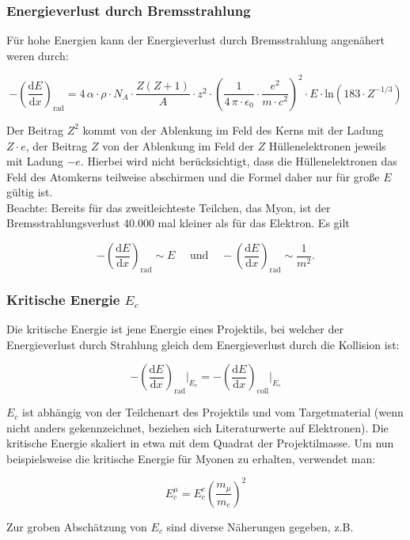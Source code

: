 \subsubsection*{Energieverlust durch Bremsstrahlung}

Für hohe Energien kann der Energieverlust durch Bremsstrahlung angenähert weren durch:

\[-\left(\frac{\mathrm{d}E}{\mathrm{d}x}\right)_{\text{rad}} = 4\,\alpha\cdot \rho\cdot N_A \cdot
\frac{Z(Z+1)}{A} \cdot z^2\cdot \left(\frac{1}{4\,\pi\cdot \epsilon_0}\cdot \frac{e^2}{m\cdot c^2}
\right)^2 \cdot E\cdot \text{ln}(183\cdot Z^{-1/3}) \]

Der Beitrag $Z^2$ kommt von der Ablenkung im Feld des Kerns mit der Ladung $Z\cdot e$, der Beitrag
$Z$ von der Ablenkung im Feld der $Z$ Hüllenelektronen jeweils mit Ladung $-e$. Hierbei wird nicht
berücksichtigt, dass die Hüllenelektronen das Feld des Atomkerns teilweise abschirmen und die Formel
daher nur für große $E$ gültig ist.
\\
Beachte: Bereits für das zweitleichteste Teilchen, das Myon, ist der Bremsstrahlungsverlust 40.000
mal kleiner als für das Elektron. Es gilt

\[-\left(\frac{\mathrm{d}E}{\mathrm{d}x}\right)_{\text{rad}} \sim E~~~~~~\text{und}~~~~~
-\left(\frac{\mathrm{d}E}{\mathrm{d}x}\right)_{\text{rad}} \sim \frac{1}{m^2}.\]

\subsubsection*{Kritische Energie $E_c$}

Die kritische Energie ist jene Energie eines Projektils, bei welcher der Energieverlust durch
Strahlung gleich dem Energieverlust durch die Kollision ist:

\[-\left(\frac{\mathrm{d}E}{\mathrm{d}x}\right)_{\text{rad}} \bigg|_{E_c} = -\left(\frac{\mathrm{d}E}{\mathrm{d}x}\right)_{\text{coll}}
\bigg|_{E_c}  \]

$E_c$ ist abhängig von der Teilchenart des Projektils und vom Targetmaterial (wenn nicht anders
gekennzeichnet, beziehen sich Literaturwerte auf Elektronen). Die kritische Energie skaliert in etwa
mit dem Quadrat der Projektilmasse. Um nun beispielsweise die kritische Energie für Myonen zu
erhalten, verwendet man:

\[E_c^\mu = E_c^e \left( \frac{m_\mu}{m_e} \right)^2 \]

Zur groben Abschätzung von $E_c$ sind diverse Näherungen gegeben, z.B.

